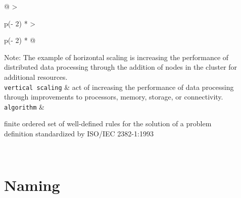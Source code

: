 \documentclass[
  letterpaper,
  DIV=11,
  numbers=noendperiod]{scrreprt}
\begin{document}
\begin{longtable}[]{@{}
  >{\raggedright\arraybackslash}p{(\columnwidth - 2\tabcolsep) * }
  >{\raggedright\arraybackslash}p{(\columnwidth - 2\tabcolsep) * }@{}}
Note: The example of horizontal scaling is increasing the performance of
distributed data processing through the addition of nodes in the cluster
for additional resources. \\
\texttt{vertical\ scaling} & act of increasing the performance of data
processing through improvements to processors, memory, storage, or
connectivity. \\
\texttt{algorithm} & \begin{minipage}[t]{\linewidth}\raggedright
finite ordered set of well-defined rules for the solution of a problem\\
definition standardized by ISO/IEC 2382-1:1993\strut
\end{minipage} \\
\end{longtable}

\section*{Naming}\label{naming}

\end{document}
